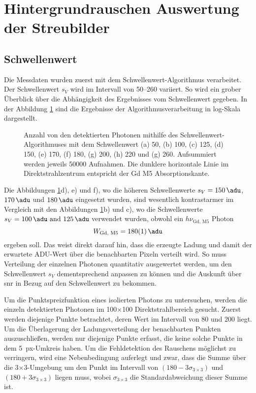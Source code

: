 \section{Hintergrundrauschen Auswertung der Streubilder}
\label{text:streuung_counting}
\subsection{Schwellenwert}
Die Messdaten wurden zuerst mit dem Schwellenwert-Algorithmus verarbeitet. Der Schwellenwert $s_V$ wird im Intervall von \SIrange{50}{260}{\adu} variiert. So wird ein grober Überblick über die Abhängigkeit des Ergebnisses vom Schwellenwert gegeben. In der Abbildung \ref{fig:th_50_100_125_150_170_180_200_220_260} sind die Ergebnisse der Algorithmusverarbeitung in log-Skala dargestellt.
\begin{figure}[H]
    \centering
    
    \caption{Anzahl von den detektierten Photonen mithilfe des Schwellenwert-Algorithmuses mit dem Schwellenwert (a) \SI{50}{\adu}, (b) \SI{100}{\adu}, (c) \SI{125}{\adu}, (d) \SI{150}{\adu}, (e) \SI{170}{\adu}, (f) \SI{180}{\adu}, (g) \SI{200}{\adu}, (h) \SI{220}{\adu} und (g) \SI{260}{\adu}. Aufsummiert werden jeweils \num{50000} Aufnahmen. Die dunklere horizontale Linie im Direktstrahlzentrum entspricht der Gd M5 Absorptionskante.}
    \label{fig:th_50_100_125_150_170_180_200_220_260}
\end{figure}
\noindent
Die Abbildungen \ref{fig:th_50_100_125_150_170_180_200_220_260}d), e) und f), wo die höheren Schwellenwerte $s_V = \SI{150}{\adu}$, $\SI{170}{\adu}$ und $\SI{180}{\adu}$ eingesetzt wurden, sind wesentlich kontrastarmer im Vergleich mit den Abbildungen \ref{fig:th_50_100_125_150_170_180_200_220_260}b) und c), wo die Schwellenwerte $s_V = \qtylist{100;125}{\adu}$ verwendet wurden, obwohl ein $h\nu_\text{Gd, M5}$ Photon
 \begin{equation}
    W_\text{Gd, M5} = \SI{180(1)}{\adu}
\end{equation}
ergeben soll. Das weist direkt darauf hin, dass die erzeugte Ladung und damit der erwartete ADU-Wert über die benachbarten Pixeln verteilt wird. So muss Verteilung der einzelnen Photonen quantitativ ausgewertet werden, um den Schwellenwert $s_V$ dementsprechend anpassen zu können und die Auskunft über \gls{snr} in Bezug auf den Schwellenwert zu bekommen.

\noindent
Um die Punktspreizfunktion eines isolierten Photons zu untersuchen, werden die einzeln detektierten Photonen im 100$\times$\SI{100}{\px} Direktstrahlbereich gesucht. Zuerst werden diejenige Punkte betrachtet, deren Wert im Intervall von \SI{80}{\adu} und \SI{200}{\adu} liegt. Um die Überlagerung der Ladungsverteilung der benachbarten Punkten auszuschließen, werden nur diejenige Punkte erfasst, die keine solche Punkte in dem \SI{5}{px}-Umkreis haben. Um die Fehldetektion des Rauschens möglichst zu verringern, wird eine Nebenbedingung auferlegt und zwar, dass die Summe über die 3$\times$\SI{3}{\px}-Umgebung um den Punkt im Intervall von $(180-3\sigma_{3\times 3})$ \si{\adu} und $(180+3\sigma_{3\times 3})$ \si{\adu} liegen muss, wobei $\sigma_{3\times 3}$ die Standardabweichung dieser Summe ist.

